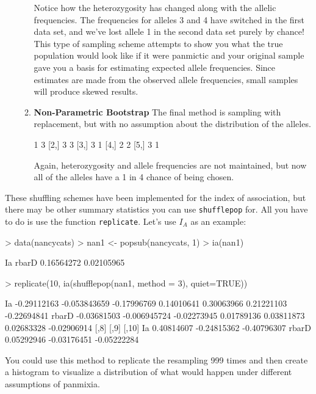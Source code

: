 \documentclass[letterpaper]{article}
\begin{document}
\begin{itemize}
\begin{enumerate}
Notice how the heterozygosity has changed along with the allelic frequencies. The frequencies for alleles 3 and 4 have switched in the first data set, and we've lost allele 1 in the second data set purely by chance! This type of sampling scheme attempts to show you what the true population would look like if it were panmictic and your original sample gave you a basis for estimating expected allele frequencies. Since estimates are made from the observed allele frequencies, small samples will produce skewed results.
    \item \textbf{Non-Parametric Bootstrap} The final method is sampling with replacement, but with no assumption about the distribution of the alleles. 
\begin{Schunk}
\begin{Soutput}
     [,1] [,2]
[1,]    1    3
[2,]    3    3
[3,]    3    1
[4,]    2    2
[5,]    3    1
\end{Soutput}
\end{Schunk}
Again, heterozygosity and allele frequencies are not maintained, but now all of the alleles have a 1 in 4 chance of being chosen.
  \end{enumerate}
\end{itemize}
These shuffling schemes have been implemented for the index of association, but there may be other summary statistics you can use \texttt{shufflepop} for. All you have to do is use the function \texttt{replicate}. Let's use $I_A$ as an example:
\begin{Schunk}
\begin{Sinput}
> data(nancycats)
> nan1 <- popsub(nancycats, 1)
> ia(nan1)
\end{Sinput}
\begin{Soutput}
        Ia      rbarD 
0.16564272 0.02105965 
\end{Soutput}
\begin{Sinput}
> replicate(10, ia(shufflepop(nan1, method = 3), quiet=TRUE))
\end{Sinput}
\begin{Soutput}
             [,1]         [,2]        [,3]       [,4]       [,5]       [,6]        [,7]
Ia    -0.29112163 -0.053843659 -0.17996769 0.14010641 0.30063966 0.21221103 -0.22694841
rbarD -0.03681503 -0.006945724 -0.02273945 0.01789136 0.03811873 0.02683328 -0.02906914
            [,8]        [,9]       [,10]
Ia    0.40814607 -0.24815362 -0.40796307
rbarD 0.05292946 -0.03176451 -0.05222284
\end{Soutput}
\end{Schunk}
You could use this method to replicate the resampling 999 times and then create a histogram to visualize a distribution of what would happen under different assumptions of panmixia.
\end{document}
